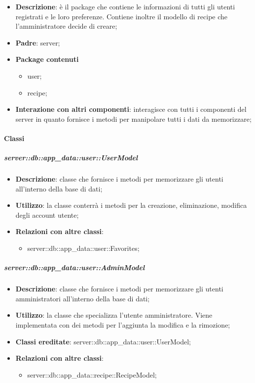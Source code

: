 	\begin{itemize}
		\item \textbf{Descrizione}: è il package che contiene le informazioni di tutti gli utenti registrati e le loro preferenze. Contiene inoltre il modello di recipe che l'amministratore decide di creare;
		\item \textbf{Padre}: server;
		\item \textbf{Package contenuti}
			\begin{itemize}
				\item user;
				\item recipe;
			\end{itemize}
		\item \textbf{Interazione con altri componenti}: interagisce con tutti i componenti del server in quanto fornisce i metodi per manipolare tutti i dati da memorizzare;
	\end{itemize}


	\paragraph{Classi} %

		\subparagraph{server::db::app\_data::user::UserModel} %
		\label{subp:server_db_app_data_user_user_model}
			\begin{itemize}
				\item \textbf{Descrizione}: classe che fornisce i metodi per memorizzare gli utenti all'interno della base di dati;
				\item \textbf{Utilizzo}: la classe conterrà i metodi per la creazione, eliminazione, modifica degli account utente;
				\item \textbf{Relazioni con altre classi}:
					\begin{itemize}
						\item server::db::app\_data::user::Favorites;
					\end{itemize}
			\end{itemize}


		\subparagraph{server::db::app\_data::user::AdminModel} %
		\label{subp:server_db_app_data_user_admin_model}
			\begin{itemize}
				\item \textbf{Descrizione}: classe che fornisce i metodi per memorizzare gli utenti amministratori all'interno della base di dati;
				\item \textbf{Utilizzo}: la classe che specializza l'utente amministratore. Viene implementata con dei metodi per l'aggiunta la modifica e la rimozione;
				\item \textbf{Classi ereditate}: server::db::app\_data::user::UserModel;
				\item \textbf{Relazioni con altre classi}:
					\begin{itemize}
						\item server::db::app\_data::recipe::RecipeModel;
					\end{itemize}
			\end{itemize}


